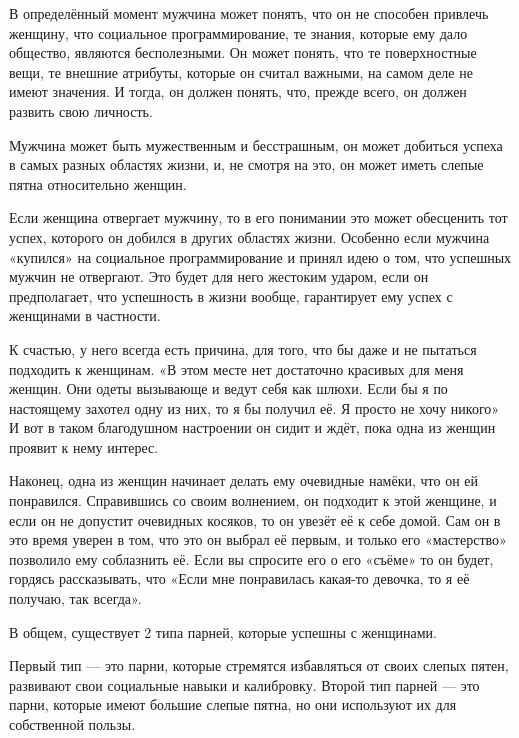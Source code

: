 В определённый момент мужчина может понять, что он не способен привлечь женщину, что социальное программирование, те знания, которые ему дало общество, являются бесполезными. Он может понять, что те поверхностные вещи, те внешние атрибуты, которые он считал важными, на самом деле не имеют значения. И тогда, он должен понять, что, прежде всего, он должен развить свою личность.

Мужчина может быть мужественным и бесстрашным, он может добиться успеха в самых разных областях жизни, и, не смотря на это, он может иметь слепые пятна относительно женщин.

Если женщина отвергает мужчину, то в его понимании это может обесценить тот успех, которого он добился в других областях жизни. Особенно если мужчина «купился» на социальное программирование и принял идею о том, что успешных мужчин не отвергают. Это будет для него жестоким ударом, если он предполагает, что успешность в жизни вообще, гарантирует ему успех с женщинами в частности.

К счастью, у него всегда есть причина, для того, что бы даже и не пытаться подходить к женщинам. «В этом месте нет достаточно красивых для меня женщин. Они одеты вызывающе и ведут себя как шлюхи. Если бы я по настоящему захотел одну из них, то я бы получил её. Я просто не хочу никого» И вот в таком благодушном настроении он сидит и ждёт, пока одна из женщин проявит к нему интерес.

Наконец, одна из женщин начинает делать ему очевидные намёки, что он ей понравился. Справившись со своим волнением, он подходит к этой женщине, и если он не допустит очевидных косяков, то он увезёт её к себе домой. Сам он в это время уверен в том, что это он выбрал её первым, и только его «мастерство» позволило ему соблазнить её. Если вы спросите его о его «съёме» то он будет, гордясь рассказывать, что «Если мне понравилась какая-то девочка, то я её получаю, так всегда».

В общем, существует 2 типа парней, которые успешны с женщинами.

Первый тип --- это парни, которые стремятся избавляться от своих слепых пятен, развивают свои социальные навыки и калибровку. Второй тип парней --- это парни, которые имеют большие слепые пятна, но они используют их для собственной пользы.


